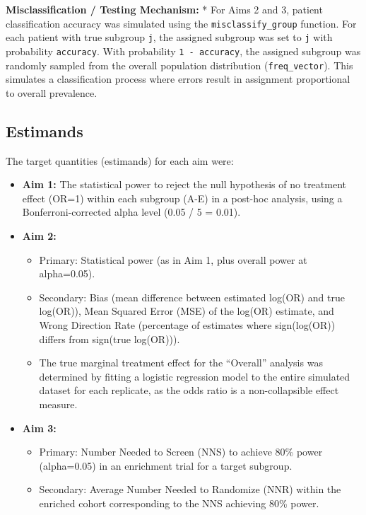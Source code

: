 \documentclass[
  letterpaper,
  DIV=11,
  numbers=noendperiod]{scrartcl}
\providecommand{\tightlist}{%
  \setlength{\itemsep}{0pt}\setlength{\parskip}{0pt}}
\begin{document}
\textbf{Misclassification / Testing Mechanism:} * For Aims 2 and 3,
patient classification accuracy was simulated using the
\texttt{misclassify\_group} function. For each patient with true
subgroup \texttt{j}, the assigned subgroup was set to \texttt{j} with
probability \texttt{accuracy}. With probability \texttt{1\ -\ accuracy},
the assigned subgroup was randomly sampled from the overall population
distribution (\texttt{freq\_vector}). This simulates a classification
process where errors result in assignment proportional to overall
prevalence.

\subsection{Estimands}\label{estimands}

The target quantities (estimands) for each aim were:

\begin{itemize}
\tightlist
\item
  \textbf{Aim 1:} The statistical power to reject the null hypothesis of
  no treatment effect (OR=1) within each subgroup (A-E) in a post-hoc
  analysis, using a Bonferroni-corrected alpha level (0.05 / 5 = 0.01).
\item
  \textbf{Aim 2:}

  \begin{itemize}
  \tightlist
  \item
    Primary: Statistical power (as in Aim 1, plus overall power at
    alpha=0.05).
  \item
    Secondary: Bias (mean difference between estimated log(OR) and true
    log(OR)), Mean Squared Error (MSE) of the log(OR) estimate, and
    Wrong Direction Rate (percentage of estimates where sign(log(OR))
    differs from sign(true log(OR))).
  \item
    The true marginal treatment effect for the ``Overall'' analysis was
    determined by fitting a logistic regression model to the entire
    simulated dataset for each replicate, as the odds ratio is a
    non-collapsible effect measure.
  \end{itemize}
\item
  \textbf{Aim 3:}

  \begin{itemize}
  \tightlist
  \item
    Primary: Number Needed to Screen (NNS) to achieve 80\% power
    (alpha=0.05) in an enrichment trial for a target subgroup.
  \item
    Secondary: Average Number Needed to Randomize (NNR) within the
    enriched cohort corresponding to the NNS achieving 80\% power.
  \end{itemize}
\end{itemize}
\end{document}
